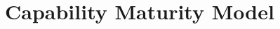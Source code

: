 \documentclass[PianoDiQualifica.tex]{subfiles}
\begin{document}
\section{Capability Maturity Model}
\end{document}
